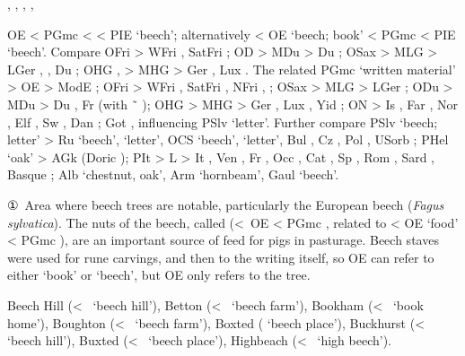 \documentclass[12pt,letterpaper,oneside,article,draft]{memoir}
\begin{document}
\begin{Lemma}
\begin{Also}
	, , , , 
\end{Also}
\begin{Etymology}
	OE  < PGmc  <  < PIE  ‘beech’;
	alternatively < OE  ‘beech; book’ < PGmc  <  PIE  ‘beech’.
	Compare
	OFri  > WFri , SatFri ;
	OD  > MDu  > Du ;
	OSax  > MLG  > LGer , , Du ;
	OHG ,  > MHG  > Ger , Lux .
	The related PGmc  ‘written material’ > OE  > ModE ;
	OFri  > WFri , SatFri , NFri , ;
	OSax  > MLG  > LGer ;
	ODu  > MDu  > Du , Fr  (with  \~\  );
	OHG  > MHG  > Ger , Lux , Yid  ;
	ON  > Is , Far , Nor , Elf , Sw , Dan ;
	Got  ,   influencing PSlv  ‘letter’.
	Further compare
	PSlv  ‘beech; letter’ > Ru   ‘beech’,   ‘letter’,
		OCS   ‘beech’,   ‘letter’,
		Bul  , Cz , Pol , USorb ;
	PHel  ‘oak’ > AGk   (Doric  );
	PIt  > L  > It , Ven , Fr , Occ , Cat ,
		Sp , Rom , Sard , Basque ;
	Alb  ‘chestnut, oak’, Arm   ‘hornbeam’, Gaul  ‘beech’.
\end{Etymology}
\begin{Definitions}
	①~Area where beech trees are notable, particularly the European beech (\textit{Fagus sylvatica}). The nuts of the beech, called  (<~OE  < PGmc , related to  < OE  ‘food’ < PGmc ), are an important source of feed for pigs in pasturage. Beech staves were used for rune carvings, and then to the writing itself, so OE  can refer to either ‘book’ or ‘beech’, but OE  only refers to the tree.
\end{Definitions}
\begin{Examples}
	Beech Hill (<~ ‘beech hill’), Betton (<~ ‘beech farm’), Bookham (<~ ‘book home’), Boughton (<~ ‘beech farm’), Boxted ( ‘beech place’), Buckhurst (<~ ‘beech hill’), Buxted (<~ ‘beech place’), Highbeach (<~ ‘high beech’).
\end{Examples}
\end{Lemma}
\end{document}
